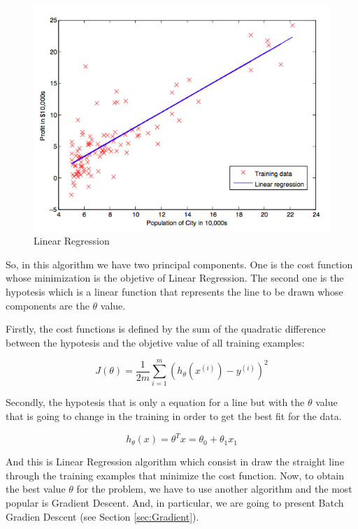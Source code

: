 \documentclass[12pt]{article}
\begin{document}
\begin{figure}[ht]
\centering
\includegraphics[width=.4\textwidth]{Regression.png}
\caption{Linear Regression}
\label{fig:figure3}
\end{figure}

So, in this algorithm we have two principal components. One is the cost function whose minimization is the objetive of Linear Regression. The second one is the hypotesis which is a linear function that represents the line to be drawn whose components are the $\theta$ value. 

Firstly, the cost functions is defined by the sum of the quadratic difference between the hypotesis and the objetive value of all training examples:

\begin{equation}
  J(\theta)=\frac{1}{2m} \displaystyle\sum_{i=1}^{m} (h_{\theta}(x^{(i)})-y^{(i)})^2
\end{equation}

Secondly, the hypotesis that is only a equation for a line but with the $\theta$ value that is going to change in the training in order to get the best fit for the data.

\begin{equation}
  h_{\theta}(x)=\theta^Tx=\theta_{0}+\theta_{1}x_{1}
\end{equation}

And this is Linear Regression algorithm which consist in draw the straight line through the training examples that minimize the cost function. Now, to obtain the best value $\theta$ for the problem, we have to use another algorithm and the most popular is Gradient Descent. And, in particular, we are going to present Batch Gradien Descent (see Section \ref{sec:Gradient}).
\end{document}
